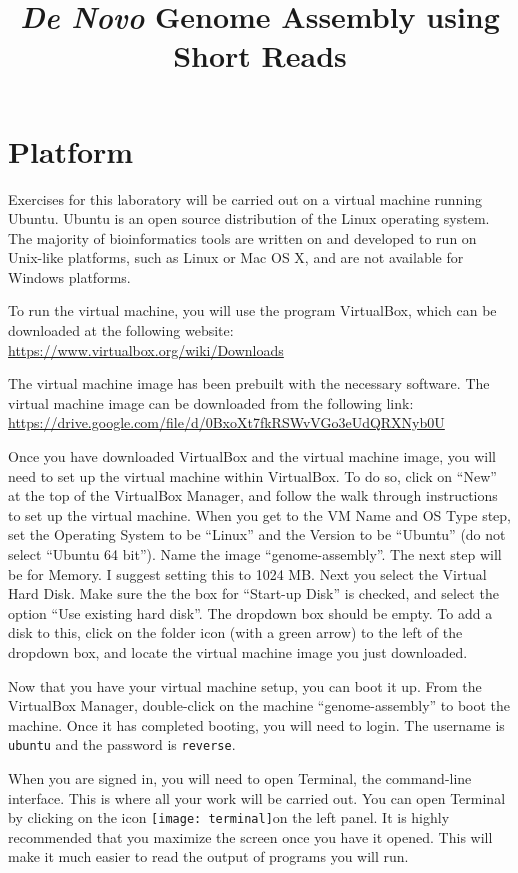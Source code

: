 \documentclass[11pt,a4paper]{scrartcl}
\title{\emph{De Novo} Genome Assembly using Short Reads}
\author{}
\date{}
\newcommand{\termicon}{\texttt{[image: terminal]}\thinspace}
\begin{document}
  \maketitle

\section*{Platform}
Exercises for this laboratory will be carried out on a virtual machine running
Ubuntu. Ubuntu is an open source distribution of the Linux operating system.
The majority of bioinformatics tools are written on and developed to run on
Unix-like platforms, such as Linux or Mac OS X, and are not available for
Windows platforms. 

To run the virtual machine, you will use the program VirtualBox, which can be
downloaded at the following website: \url{https://www.virtualbox.org/wiki/Downloads}

The virtual machine image has been prebuilt with the necessary software. The
virtual machine image can be downloaded from the following link:
\url{https://drive.google.com/file/d/0BxoXt7fkRSWvVGo3eUdQRXNyb0U}

Once you have downloaded VirtualBox and the virtual machine image, you will
need to set up the virtual machine within VirtualBox. To do so, click on ``New''
at the top of the VirtualBox Manager, and follow the walk through instructions
to set up the virtual machine. When you get to the VM Name and OS Type step,
set the Operating System to be ``Linux'' and the Version to be ``Ubuntu'' (do not
select ``Ubuntu 64 bit''). Name the image “genome-assembly”. The next step will be
for Memory. I suggest setting this to 1024 MB. Next you select the Virtual Hard
Disk. Make sure the the box for “Start-up Disk” is checked, and select the
option “Use existing hard disk”. The dropdown box should be empty. To add a
disk to this, click on the folder icon (with a green arrow) to the left of the
dropdown box, and locate the virtual machine image you just downloaded.

Now that you have your virtual machine setup, you can boot it up. From the
VirtualBox Manager, double-click on the machine ``genome-assembly'' to boot the
machine.  Once it has completed booting, you will need to login. The username
is \texttt{ubuntu} and the password is \texttt{reverse}. 

When you are signed in, you will need to open Terminal, the command-line
interface. This is where all your work will be carried out. You can open
Terminal by clicking on the icon \termicon               on the left panel. It is highly recommended
that you maximize the screen once you have it opened. This will make it much
easier to read the output of programs you will run. 
\end{document}
